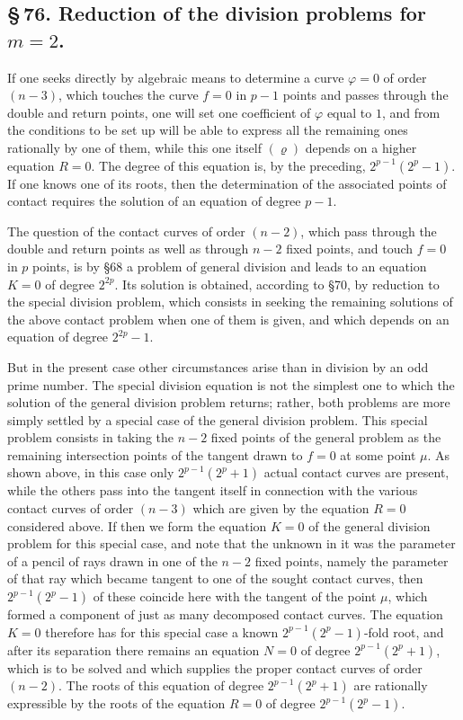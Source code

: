 \documentclass[10pt]{article}
\begin{document}
\subsection*{\S\,76. Reduction of the division problems for \(m=2\).}

If one seeks directly by algebraic means to determine a curve \(\varphi=0\) of order \((n-3)\), which touches the curve \(f=0\) in \(p-1\) points and passes through the double and return points, one will set one coefficient of \(\varphi\) equal to \(1\), and from the conditions to be set up will be able to express all the remaining ones rationally by one of them, while this one itself \((\varrho)\) depends on a higher equation \(R=0\). The degree of this equation is, by the preceding, \(2^{p-1}(2^p-1)\). If one knows one of its roots, then the determination of the associated points of contact requires the solution of an equation of degree \(p-1\).

The question of the contact curves of order \((n-2)\), which pass through the double and return points as well as through \(n-2\) fixed points, and touch \(f=0\) in \(p\) points, is by §68 a problem of general division and leads to an equation \(K=0\) of degree \(2^{2p}\). Its solution is obtained, according to §70, by reduction to the special division problem, which consists in seeking the remaining solutions of the above contact problem when one of them is given, and which depends on an equation of degree \(2^{2p}-1\).

But in the present case other circumstances arise than in division by an odd prime number. The special division equation is not the simplest one to which the solution of the general division problem returns; rather, both problems are more simply settled by a special case of the general division problem. This special problem consists in taking the \(n-2\) fixed points of the general problem as the remaining intersection points of the tangent drawn to \(f=0\) at some point \(\mu\). As shown above, in this case only \(2^{p-1}(2^p+1)\) actual contact curves are present, while the others pass into the tangent itself in connection with the various contact curves of order \((n-3)\) which are given by the equation \(R=0\) considered above. If then we form the equation \(K=0\) of the general division problem for this special case, and note that the unknown in it was the parameter of a pencil of rays drawn in one of the \(n-2\) fixed points, namely the parameter of that ray which became tangent to one of the sought contact curves, then \(2^{p-1}(2^p-1)\) of these coincide here with the tangent of the point \(\mu\), which formed a component of just as many decomposed contact curves. The equation \(K=0\) therefore has for this special case a known \(2^{p-1}(2^p-1)\)-fold root, and after its separation there remains an equation \(N=0\) of degree \(2^{p-1}(2^p+1)\), which is to be solved and which supplies the proper contact curves of order \((n-2)\). The roots of this equation of degree \(2^{p-1}(2^p+1)\) are rationally expressible by the roots of the equation \(R=0\) of degree \(2^{p-1}(2^p-1)\).
\end{document}
